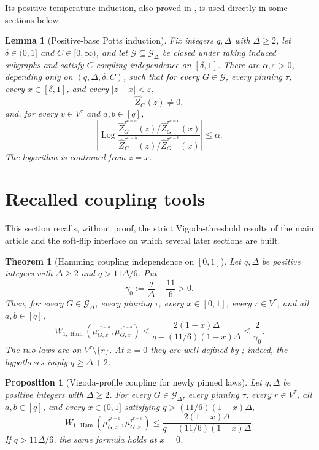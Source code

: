 \documentclass[11pt,reqno]{article}
\theoremstyle{plain}
\newtheorem{theorem}{Theorem}[section]
\newtheorem{proposition}[proposition]{Proposition}
\newtheorem{lemma}[lemma]{Lemma}
\theoremstyle{definition}
\theoremstyle{remark}
\newcommand{\eps}{\varepsilon}
\newcommand{\Log}{\operatorname{Log}}          %
\DeclareMathOperator{\Ham}{Ham}
\newcommand{\Deg}{\Delta}                        %
\newcommand{\WHam}{W_{1,\Ham}}                   %
\newcommand{\colours}{[q]}                        %
\newcommand{\Gdeg}{\mathcal{G}_{\Deg}}
\newcommand{\nZpin}[2]{\widehat Z_{#1}^{#2}}
\newcommand{\mupin}[3]{\mu_{#1,#3}^{#2}}
\newcommand{\gapq}{\gamma_0}
\begin{document}
Its positive-temperature induction, also proved in
\cite{ShaoShi2026ZeroFreeness}, is used directly in some sections below.

\begin{lemma}[Positive-base Potts induction]
\label{lem:potts-positive-response}
Fix integers \(q,\Deg\) with \(\Deg\ge2\), let \(\delta\in(0,1]\) and
\(C\in[0,\infty)\), and let
\(\mathcal G\subseteq\Gdeg\) be closed under taking induced subgraphs and satisfy
\(C\)-coupling independence on \([\delta,1]\).  There are
\(\alpha,\eps>0\), depending only on \((q,\Deg,\delta,C)\), such that for
every \(G\in\mathcal G\), every pinning \(\tau\), every
\(x\in[\delta,1]\), and every \(|z-x|<\eps\),
\[
  \nZpin{G}{\tau}(z)\ne0,
\]
and, for every \(v\in V^\tau\) and \(a,b\in\colours\),
\begin{equation}\label{eq:potts-response-invariant}
  \left|\Log
  \frac{\nZpin{G}{\tau^{v=a}}(z)/\nZpin{G}{\tau^{v=a}}(x)}
       {\nZpin{G}{\tau^{v=b}}(z)/\nZpin{G}{\tau^{v=b}}(x)}\right|
  \le\alpha.
\end{equation}
The logarithm is continued from \(z=x\).
\end{lemma}

\section{Recalled coupling tools}
\label{sec:recalled-tools}

This section recalls, without proof, the strict Vigoda-threshold results
of the main article \cite{ShaoShi2026ZeroFreeness} and the soft-flip interface
on which several later sections are built.

\begin{theorem}[Hamming coupling independence on \texorpdfstring{$[0,1]$}{[0,1]}]
\label{thm:strict-ci}
Let \(q,\Deg\) be positive integers with \(\Deg\ge2\) and
\(q>11\Deg/6\).  Put
\[
  \gapq:=\frac q\Deg-\frac{11}{6}>0.
\]
Then, for every \(G\in\Gdeg\), every pinning \(\tau\), every
\(x\in[0,1]\), every \(r\in V^\tau\), and all
\(a,b\in\colours\),
\[
  \WHam\!\left(
    \mupin{G}{\tau^{r=a}}{x},
    \mupin{G}{\tau^{r=b}}{x}
  \right)
  \le
  \frac{2(1-x)\Deg}{q-(11/6)(1-x)\Deg}
  \le\frac2{\gapq}.
\]
The two laws are on \(V^\tau\setminus\{r\}\).  At \(x=0\) they are
well defined by ; indeed, the hypotheses imply
\(q\ge\Deg+2\).
\end{theorem}

\begin{proposition}[Vigoda-profile coupling for newly pinned laws]
\label{prop:full-interval-hci}
Let \(q,\Deg\) be positive integers with \(\Deg\ge2\).  For every
\(G\in\Gdeg\), every pinning \(\tau\), every \(r\in V^\tau\), all
\(a,b\in\colours\), and every \(x\in(0,1]\) satisfying
\(q>(11/6)(1-x)\Deg\),
\begin{equation}\label{eq:vigoda-master-ci}
  \WHam\!\left(
    \mupin{G}{\tau^{r=a}}{x},\mupin{G}{\tau^{r=b}}{x}
  \right)
  \le\frac{2(1-x)\Deg}{q-(11/6)(1-x)\Deg}.
\end{equation}
If \(q>11\Deg/6\), the same formula holds at \(x=0\).
\end{proposition}
\end{document}
